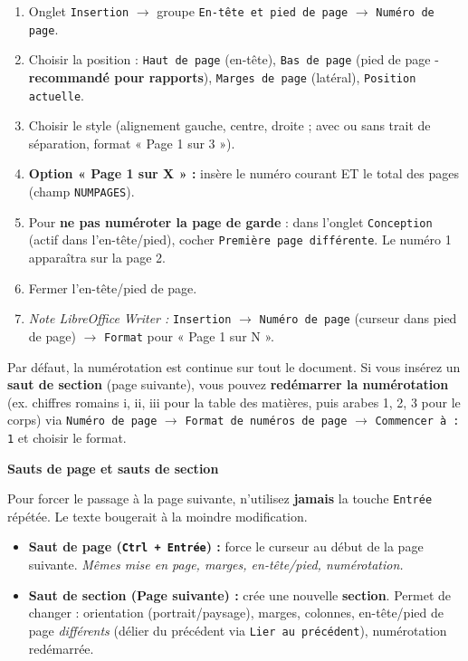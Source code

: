 \documentclass[11pt]{article}
\begin{document}
\begin{methode}
    \begin{enumerate}
        \item Onglet \texttt{Insertion} $\rightarrow$ groupe \texttt{En-tête et pied de page} $\rightarrow$ \texttt{Numéro de page}.
        \item Choisir la position : \texttt{Haut de page} (en-tête), \texttt{Bas de page} (pied de page - \textbf{recommandé pour rapports}), \texttt{Marges de page} (latéral), \texttt{Position actuelle}.
        \item Choisir le style (alignement gauche, centre, droite ; avec ou sans trait de séparation, format « Page 1 sur 3 »).
        \item \textbf{Option « Page 1 sur X » :} insère le numéro courant ET le total des pages (champ \texttt{NUMPAGES}).
        \item Pour \textbf{ne pas numéroter la page de garde} : dans l'onglet \texttt{Conception} (actif dans l'en-tête/pied), cocher \texttt{Première page différente}. Le numéro 1 apparaîtra sur la page 2.
        \item Fermer l'en-tête/pied de page.
        \item \textit{Note LibreOffice Writer :} \texttt{Insertion} $\rightarrow$ \texttt{Numéro de page} (curseur dans pied de page) $\rightarrow$ \texttt{Format} pour « Page 1 sur N ».
    \end{enumerate}
\end{methode}

\begin{aretenir}
    Par défaut, la numérotation est continue sur tout le document. Si vous insérez un \textbf{saut de section} (page suivante), vous pouvez \textbf{redémarrer la numérotation} (ex. chiffres romains i, ii, iii pour la table des matières, puis arabes 1, 2, 3 pour le corps) via \texttt{Numéro de page} $\rightarrow$ \texttt{Format de numéros de page} $\rightarrow$ \texttt{Commencer à : 1} et choisir le format.
\end{aretenir}

\textbf{Sauts de page et sauts de section}\par

Pour forcer le passage à la page suivante, n'utilisez \textbf{jamais} la touche \texttt{Entrée} répétée. Le texte bougerait à la moindre modification.

\begin{definition}
    \begin{itemize}
        \item \textbf{Saut de page (\texttt{Ctrl + Entrée}) :} force le curseur au début de la page suivante. \emph{Mêmes mise en page, marges, en-tête/pied, numérotation.}
        \item \textbf{Saut de section (Page suivante) :} crée une nouvelle \textbf{section}. Permet de changer : orientation (portrait/paysage), marges, colonnes, en-tête/pied de page \emph{différents} (délier du précédent via \texttt{Lier au précédent}), numérotation redémarrée.
    \end{itemize}
\end{definition}
\end{document}
